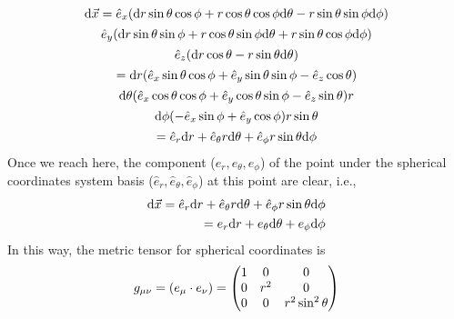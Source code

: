 \documentclass[letterpaper,10pt,english]{sphinxmanual}
\begin{document}
\begin{gather}
\begin{split}\mathrm d\vec x =  \hat e_x (\mathrm dr \sin\theta\cos\phi+r\cos\theta\cos\phi\mathrm d\theta-r\sin\theta\sin\phi\mathrm d\phi)\end{split}\notag\\\begin{split}\hat e_y (\mathrm dr\sin\theta\sin\phi+r\cos\theta\sin\phi\mathrm d\theta+r\sin\theta\cos\phi\mathrm d\phi)\end{split}\notag\\\begin{split}\hat e_z (\mathrm dr\cos\theta-r\sin\theta\mathrm d\theta)\end{split}\notag\\\begin{split} = \mathrm dr(\hat e_x\sin\theta\cos\phi +\hat e_y \sin\theta\sin\phi -\hat e_z \cos\theta)\end{split}\notag\\\begin{split}\mathrm d\theta (\hat e_x\cos\theta\cos\phi +\hat e_y \cos\theta\sin\phi - \hat e_z \sin\theta)r\end{split}\notag\\\begin{split}\mathrm d\phi (-\hat e_x\sin\phi +\hat e_y \cos\phi)r\sin\theta\end{split}\notag\\\begin{split}=\hat e_r\mathrm dr+\hat e_\theta r\mathrm d\theta +\hat e_\phi r\sin\theta\mathrm d \phi\end{split}\notag
\end{gather}
Once we reach here, the component (\(e_r ,e_\theta, e_\phi\)) of the point under the spherical coordinates system basis (\(\hat e_r, \hat e_\theta, \hat e_\phi\)) at this point are clear, i.e.,
\begin{gather}
\begin{split}\mathrm d\vec x = \hat e_r\mathrm d r+\hat e_\theta r\mathrm d \theta+\hat e_\phi r\sin\theta \mathrm d\phi \\
 = e_r\mathrm d r+e_\theta \mathrm d\theta+e_\phi \mathrm d\phi\end{split}\notag
\end{gather}
In this way, the metric tensor for spherical coordinates is
\begin{gather}
\begin{split}g_{\mu\nu}=(e_\mu\cdot e_\nu) = \begin{pmatrix}
1 & 0 & 0 \\
0 & r^2 &  0 \\
0 & 0 & r^2 \sin^2\theta \end{pmatrix}\end{split}\notag
\end{gather}
\end{document}
